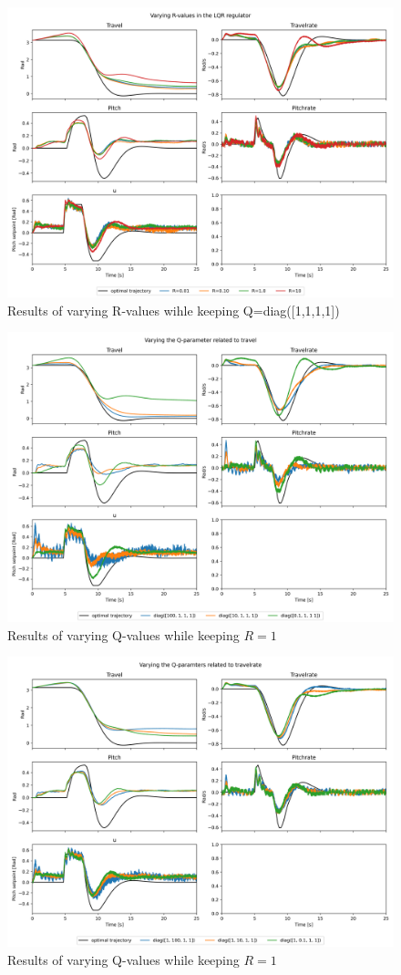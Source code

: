 \documentclass[../main.tex]{subfiles}
\begin{document}
\begin{figure}[h]
	\centering
    \includegraphics[width=0.8\linewidth]{figures/LAB3_R_variations.png}
	\caption{Results of varying R-values wihle keeping Q=diag([1,1,1,1])}
	\label{fig:LAB3_R_variations}
\end{figure}

\begin{figure}[h]
	\centering
	\includegraphics[width=0.8\linewidth]{figures/LAB3_Q_variations.png}
	\caption{Results of varying Q-values while keeping $R=1$}
	\label{fig:LAB3_Q_variations_travel}
\end{figure}

\begin{figure}[h]
	\centering
	\includegraphics[width=0.8\linewidth]{figures/LAB3_Q_variations_travelrate.png}
	\caption{Results of varying Q-values while keeping $R=1$}
	\label{fig:LAB3_Q_variations_travelrate}
\end{figure}
\end{document}
